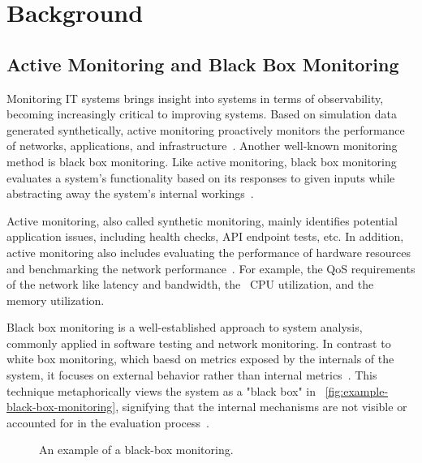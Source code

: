 \usetikzlibrary{positioning,fit,calc,arrows,shapes}

\chapter{Background}\label{chapter:background}

\section{Active Monitoring and Black Box Monitoring}

Monitoring IT systems brings insight into systems in terms of observability, becoming increasingly critical to improving systems. Based on simulation data generated synthetically, active monitoring proactively monitors the performance of networks, applications, and infrastructure~\parencite{splunkActiveVsPassive2023}. Another well-known monitoring method is black box monitoring. Like active monitoring, black box monitoring evaluates a system's functionality based on its responses to given inputs while abstracting away the system's internal workings~\parencite{jorgensenSoftwareTestingCraftsman2021}. 

Active monitoring, also called synthetic monitoring, mainly identifies potential application issues, including health checks, \ac{API} endpoint tests, etc. In addition, active monitoring also includes evaluating the performance of hardware resources and benchmarking the network performance~\parencite{splunkActiveVsPassive2023}. For example, the \ac{QoS} requirements of the network like latency and bandwidth, the ~\ac{CPU} utilization, and the memory utilization. 

Black box monitoring is a well-established approach to system analysis, commonly applied in software testing and network monitoring. In contrast to white box monitoring, which baesd on metrics exposed by the internals of the system, it focuses on external behavior rather than internal metrics~\parencite{beyerSiteReliabilityEngineering2016}. This technique metaphorically views the system as a "black box" in ~\autoref{fig:example-black-box-monitoring}, signifying that the internal mechanisms are not visible or accounted for in the evaluation process~\parencite{myersArtSoftwareTesting2004}. 

\begin{figure}[htpb]
    \centering
    \caption[Black-box monitoring Example]{An example of a black-box monitoring.}\label{fig:example-black-box-monitoring}
\end{figure}

